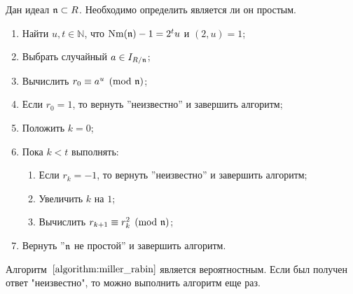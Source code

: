 \documentclass[_00_dissertation.tex]{subfiles}
\begin{document}
\begin{algorithm}\label{algorithm:miller_rabin}
    Дан идеал $\mathfrak{n} \subset R$.
    Необходимо определить является ли он простым.

    \begin{enumerate}
        \item Найти $u, t \in \mathbb{N}$, что $\textrm{Nm}(\mathfrak{n}) - 1 = 2^t u$ и $(2, u) = 1$;
        
        \item Выбрать случайный $a \in I_{R/\mathfrak{n}}$;

        \item Вычислить $r_0 \equiv a^u \pmod{\mathfrak{n}}$;

        \item Если $r_0 = 1$, то вернуть ''неизвестно'' и завершить алгоритм;

        \item Положить $k = 0$;

        \item Пока $k < t$ выполнять:
        \begin{enumerate}
            \item Если $r_k = -1$, то вернуть ''неизвестно'' и завершить алгоритм;

            \item Увеличить $k$ на $1$;

            \item Вычислить $r_{k+1} \equiv r_k^2 \pmod{\mathfrak{n}}$;
        \end{enumerate}

        \item Вернуть ''$\mathfrak{n}$ не простой'' и завершить алгоритм.
    \end{enumerate}
\end{algorithm}

\begin{remark}
    Алгоритм~$\ref{algorithm:miller_rabin}$ является вероятностным.
    Если был получен ответ "неизвестно", то можно выполнить алгоритм еще раз.
\end{remark}
\end{document}
